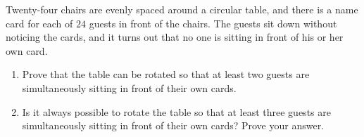 Twenty-four chairs are evenly spaced around a circular table, and there is a name card for each of $24$ guests in front of the chairs. The guests sit down without noticing the cards, and it turns out that no one is sitting in front of his or her own card.
\begin{enumerate}
\item[(a)] Prove that the table can be rotated so that at least two guests are simultaneously sitting in front of their own cards.
\item[(b)] Is it always possible to rotate the table so that at least three guests are simultaneously sitting in front of their own cards? Prove your answer.
\end{enumerate}
